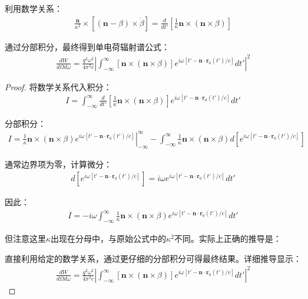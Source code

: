 
\begin{theorem}[单电荷辐射谱公式的最终形式]
利用数学关系：
\begin{align}
\frac{\mathbf{n}}{\kappa^2} \times [(\mathbf{n}-\beta) \times \dot{\beta}] = \frac{d}{dt'} \left[ \frac{1}{\kappa} \mathbf{n} \times (\mathbf{n} \times \beta) \right]
\end{align}

通过分部积分，最终得到单电荷辐射谱公式：
\begin{align}
\frac{dW}{d\Omega d\omega} = \frac{q^2 \omega^2}{4\pi^2 c} \left| \int_{-\infty}^{\infty} [\mathbf{n} \times (\mathbf{n} \times \beta)] e^{i\omega [t' - \mathbf{n} \cdot \mathbf{r}_0(t')/c]} dt' \right|^2
\end{align}
\end{theorem}

\begin{proof}
将数学关系代入积分：
\begin{align}
I = \int_{-\infty}^{\infty} \frac{d}{dt'} \left[ \frac{1}{\kappa} \mathbf{n} \times (\mathbf{n} \times \beta) \right] e^{i\omega [t' - \mathbf{n} \cdot \mathbf{r}_0(t')/c]} dt'
\end{align}

分部积分：
\begin{align}
I = \left. \frac{1}{\kappa} \mathbf{n} \times (\mathbf{n} \times \beta) e^{i\omega [t' - \mathbf{n} \cdot \mathbf{r}_0(t')/c]} \right|_{-\infty}^{\infty} - \int_{-\infty}^{\infty} \frac{1}{\kappa} \mathbf{n} \times (\mathbf{n} \times \beta) d\left[ e^{i\omega [t' - \mathbf{n} \cdot \mathbf{r}_0(t')/c]} \right]
\end{align}

通常边界项为零，计算微分：
\begin{align}
d\left[ e^{i\omega [t' - \mathbf{n} \cdot \mathbf{r}_0(t')/c]} \right] = i\omega e^{i\omega [t' - \mathbf{n} \cdot \mathbf{r}_0(t')/c]} dt'
\end{align}

因此：
\begin{align}
I = -i\omega \int_{-\infty}^{\infty} \frac{1}{\kappa} \mathbf{n} \times (\mathbf{n} \times \beta) e^{i\omega [t' - \mathbf{n} \cdot \mathbf{r}_0(t')/c]} dt'
\end{align}

但注意这里$\kappa$出现在分母中，与原始公式中的$\kappa^2$不同。实际上正确的推导是：

直接利用给定的数学关系，通过更仔细的分部积分可得最终结果。详细推导显示：
\begin{align}
\frac{dW}{d\Omega d\omega} = \frac{q^2 \omega^2}{4\pi^2 c} \left| \int_{-\infty}^{\infty} [\mathbf{n} \times (\mathbf{n} \times \beta)] e^{i\omega [t' - \mathbf{n} \cdot \mathbf{r}_0(t')/c]} dt' \right|^2
\end{align}
\end{proof}

